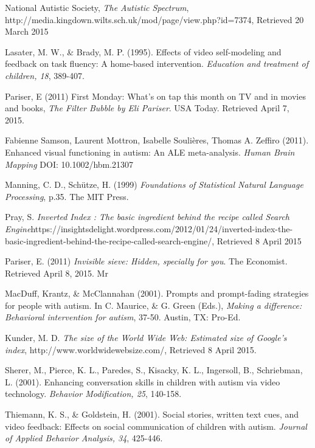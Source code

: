 \documentclass[a4paper, 11pt]{article}
\begin{document}
\begin{thebibliography}{100}
National Autistic Society, \textit{The Autistic Spectrum}, http://media.kingdown.wilts.sch.uk/mod/page/view.php?id=7374, Retrieved 20 March 2015

Lasater, M. W., \& Brady, M. P. (1995). Effects of video self-modeling and feedback on task fluency: A home-based intervention. \textit{Education and treatment of children, 18}, 389-407.

 Pariser, E (2011) First Monday: What's on tap this month on TV and in movies and books, \textit{The Filter Bubble by Eli Pariser}. USA Today. Retrieved April 7, 2015. 

Fabienne Samson, Laurent Mottron, Isabelle Soulières, Thomas A. Zeffiro (2011). Enhanced visual functioning in autism: An ALE meta-analysis. \textit{Human Brain Mapping} DOI: 10.1002/hbm.21307

Manning, C. D., Schütze, H. (1999) \textit{Foundations of Statistical Natural Language Processing}, p.35. The MIT Press.

 Pray, S. \textit{Inverted Index : The basic ingredient behind the recipe called Search Engine}https://insightsdelight.wordpress.com/2012/01/24/inverted-index-the-basic-ingredient-behind-the-recipe-called-search-engine/, Retrieved 8 April 2015

 Pariser, E. (2011) \textit{Invisible sieve: Hidden, specially for you}. The Economist. Retrieved April 8, 2015. Mr 

 MacDuff, Krantz, \& McClannahan (2001). Prompts and prompt-fading strategies for people with autism. In C. Maurice, \& G. Green (Eds.), \textit{Making a difference: Behavioral intervention for autism}, 37-50. Austin, TX: Pro-Ed.

 Kunder, M. D. \textit{The size of the World Wide Web: Estimated size of Google's index}, http://www.worldwidewebsize.com/, Retrieved 8 April 2015.


Sherer, M., Pierce, K. L., Paredes, S., Kisacky, K. L., Ingersoll, B., Schriebman, L. (2001). Enhancing conversation skills in children with autism via video technology. \textit{Behavior Modification, 25}, 140-158.


Thiemann, K. S., \& Goldstein, H. (2001). Social stories, written text cues, and video feedback: Effects on social communication of children with autism. \textit{Journal of Applied Behavior Analysis, 34}, 425-446.


\end{thebibliography}
\end{document}
